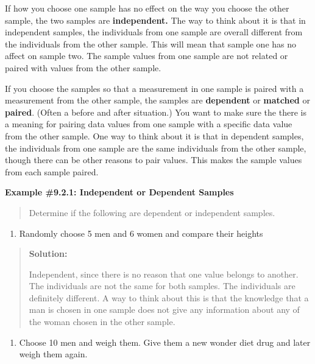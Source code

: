 \documentclass[]{book}
\providecommand{\tightlist}{%
  \setlength{\itemsep}{0pt}\setlength{\parskip}{0pt}}
\begin{document}
If how you choose one sample has no effect on the way you choose the other sample, the two samples are \textbf{independent.} The way to think about it is that in independent samples, the individuals from one sample are overall different from the individuals from the other sample. This will mean that sample one has no affect on sample two. The sample values from one sample are not related or paired with values from the other sample.

If you choose the samples so that a measurement in one sample is paired with a measurement from the other sample, the samples are \textbf{dependent} or \textbf{matched} or \textbf{paired}. (Often a before and after situation.) You want to make sure the there is a meaning for pairing data values from one sample with a specific data value from the other sample. One way to think about it is that in dependent samples, the individuals from one sample are the same individuals from the other sample, though there can be other reasons to pair values. This makes the sample values from each sample paired.

\textbf{Example \#9.2.1: Independent or Dependent Samples}

\begin{quote}
Determine if the following are dependent or independent samples.
\end{quote}

\begin{enumerate}
\def\labelenumi{\alph{enumi}.}
\tightlist
\item
  Randomly choose 5 men and 6 women and compare their heights
\end{enumerate}

\begin{quote}
\textbf{Solution:}

Independent, since there is no reason that one value belongs to another. The individuals are not the same for both samples. The individuals are definitely different. A way to think about this is that the knowledge that a man is chosen in one sample does not give any information about any of the woman chosen in the other sample.
\end{quote}

\begin{enumerate}
\def\labelenumi{\alph{enumi}.}
\setcounter{enumi}{1}
\tightlist
\item
  Choose 10 men and weigh them. Give them a new wonder diet drug and later weigh them again.
\end{enumerate}
\end{document}
